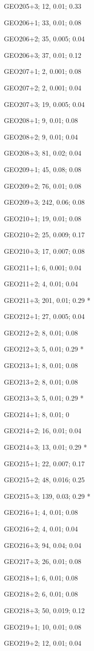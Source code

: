 GEO205+3; 12, 0.01; 0.33

GEO206+1; 33, 0.01; 0.08

GEO206+2; 35, 0.005; 0.04

GEO206+3; 37, 0.01; 0.12

GEO207+1; 2, 0.001; 0.08

GEO207+2; 2, 0.001; 0.04

GEO207+3; 19, 0.005; 0.04

GEO208+1; 9, 0.01; 0.08

GEO208+2; 9, 0.01; 0.04

GEO208+3; 81, 0.02; 0.04

GEO209+1; 45, 0.08; 0.08 

GEO209+2; 76, 0.01; 0.08

GEO209+3; 242, 0.06; 0.08

GEO210+1; 19, 0.01; 0.08

GEO210+2; 25, 0.009; 0.17

GEO210+3; 17, 0.007; 0.08

GEO211+1; 6, 0.001; 0.04

GEO211+2; 4, 0.01; 0.04

GEO211+3; 201, 0.01; 0.29 *

GEO212+1; 27, 0.005; 0.04

GEO212+2; 8, 0.01; 0.08

GEO212+3; 5, 0.01; 0.29 *

GEO213+1; 8, 0.01; 0.08

GEO213+2; 8, 0.01; 0.08

GEO213+3; 5, 0.01; 0.29 *

GEO214+1; 8, 0.01; 0

GEO214+2; 16, 0.01; 0.04

GEO214+3; 13, 0.01; 0.29 *

GEO215+1; 22, 0.007; 0.17

GEO215+2; 48, 0.016; 0.25

GEO215+3; 139, 0.03; 0.29 *

GEO216+1; 4, 0.01; 0.08

GEO216+2; 4, 0.01; 0.04

GEO216+3; 94, 0.04; 0.04

GEO217+3; 26, 0.01; 0.08

GEO218+1; 6, 0.01; 0.08

GEO218+2; 6, 0.01; 0.08

GEO218+3; 50, 0.019; 0.12

GEO219+1; 10, 0.01; 0.08

GEO219+2; 12, 0.01; 0.04

